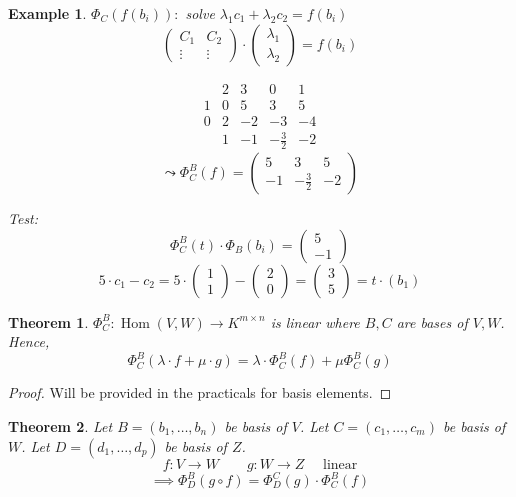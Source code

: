 \documentclass[a4paper,landscape,twocolumn]{article}
\newtheorem{theorem}{Theorem}[section]
\newtheorem{ex}{Example}[section]
\DeclareMathOperator\Hom{Hom} %
\begin{document}
\begin{ex}
  $\Phi_C(f(b_i)):$ solve $\lambda_1 c_1 + \lambda_2 c_2 = f(b_i)$
  \[
    \begin{pmatrix} C_1 & C_2 \\ \vdots & \vdots \end{pmatrix}
    \cdot
    \begin{pmatrix} \lambda_1 \\ \lambda_2 \end{pmatrix} = f(b_i)
  \]

  \[
    \begin{array}{cc|ccc}
        & 2 & 3 & 0 & 1 \\
      1 & 0 & 5 & 3 & 5 \\
    \hline
      0 & 2 & -2 & -3 & -4 \\
        & 1 & -1 & -\frac32 & -2
    \end{array}
  \] \[
    \leadsto
    \Phi_C^B(f) = \begin{pmatrix}
      5 & 3 & 5 \\
      -1 & -\frac32 & -2
    \end{pmatrix}
  \]


  Test:
  \[ \Phi_C^B(t) \cdot \Phi_B(b_i) = \begin{pmatrix} 5 \\ -1 \end{pmatrix} \]
  \[
    5 \cdot c_1 - c_2 = 5 \cdot \begin{pmatrix} 1 \\ 1 \end{pmatrix} - \begin{pmatrix} 2 \\ 0 \end{pmatrix}
    = \begin{pmatrix} 3 \\ 5 \end{pmatrix} = t \cdot (b_1)
  \]
\end{ex}

\begin{theorem}
  \label{satz-6.54}
  $\Phi_C^B: \Hom(V,W) \to K^{m\times n}$ is linear where $B,C$ are bases of $V, W$.
  Hence,
  \[ \Phi_C^B(\lambda \cdot f + \mu \cdot g) = \lambda \cdot \Phi_C^B(f) + \mu \Phi_C^B(g) \]
\end{theorem}
\begin{proof}
  Will be provided in the practicals for basis elements.
\end{proof}

\begin{theorem}
  \label{satz-6.56}
  Let $B = (b_1, \ldots, b_n)$ be basis of $V$.
  Let $C = (c_1, \ldots, c_m)$ be basis of $W$.
  Let $D = (d_1, \ldots, d_p)$ be basis of $Z$.
  \[ f: V \to W \qquad g: W \to Z \quad \text{ linear} \]
  \[ \implies \Phi_D^B (g \circ f) = \Phi_D^C(g) \cdot \Phi_C^B(f) \]
\end{theorem}
\end{document}
